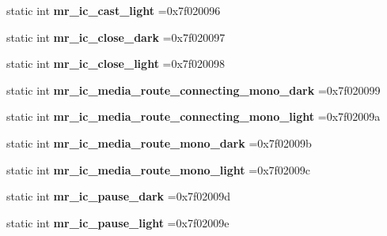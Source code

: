\begin{DoxyCompactItemize}
static int {\bfseries mr\+\_\+ic\+\_\+cast\+\_\+light} =0x7f020096
\item 
\mbox{\label{classandroid_1_1support_1_1v4_1_1R_1_1drawable_a474a1389c32f3b9752c25cd791a67088}} 
static int {\bfseries mr\+\_\+ic\+\_\+close\+\_\+dark} =0x7f020097
\item 
\mbox{\label{classandroid_1_1support_1_1v4_1_1R_1_1drawable_aa4bc803ce8850978779d4671fb430bbb}} 
static int {\bfseries mr\+\_\+ic\+\_\+close\+\_\+light} =0x7f020098
\item 
\mbox{\label{classandroid_1_1support_1_1v4_1_1R_1_1drawable_a26f7ebbe3ecc3d4b325243bea09fdfc7}} 
static int {\bfseries mr\+\_\+ic\+\_\+media\+\_\+route\+\_\+connecting\+\_\+mono\+\_\+dark} =0x7f020099
\item 
\mbox{\label{classandroid_1_1support_1_1v4_1_1R_1_1drawable_af53e42aaff9bc65a95ce68978f76b092}} 
static int {\bfseries mr\+\_\+ic\+\_\+media\+\_\+route\+\_\+connecting\+\_\+mono\+\_\+light} =0x7f02009a
\item 
\mbox{\label{classandroid_1_1support_1_1v4_1_1R_1_1drawable_aad857d1846ad1963547d58c269743072}} 
static int {\bfseries mr\+\_\+ic\+\_\+media\+\_\+route\+\_\+mono\+\_\+dark} =0x7f02009b
\item 
\mbox{\label{classandroid_1_1support_1_1v4_1_1R_1_1drawable_a6e9a4b67450c7cf9b2e88e5dda3772ff}} 
static int {\bfseries mr\+\_\+ic\+\_\+media\+\_\+route\+\_\+mono\+\_\+light} =0x7f02009c
\item 
\mbox{\label{classandroid_1_1support_1_1v4_1_1R_1_1drawable_a9ee9f068ccad1d9265e77a5931792f3b}} 
static int {\bfseries mr\+\_\+ic\+\_\+pause\+\_\+dark} =0x7f02009d
\item 
\mbox{\label{classandroid_1_1support_1_1v4_1_1R_1_1drawable_a42f82e476f5d64fbe166d043d1980115}} 
static int {\bfseries mr\+\_\+ic\+\_\+pause\+\_\+light} =0x7f02009e

\end{DoxyCompactItemize}
